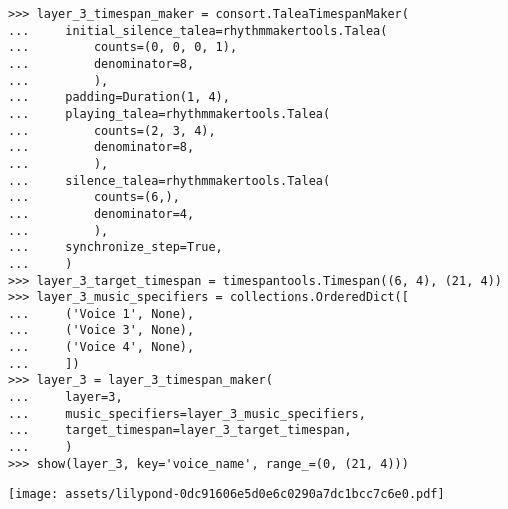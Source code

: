 \begin{comment}
<abjad>
layer_3_timespan_maker = consort.TaleaTimespanMaker(
    initial_silence_talea=rhythmmakertools.Talea(
        counts=(0, 0, 0, 1),
        denominator=8,
        ),
    padding=Duration(1, 4),
    playing_talea=rhythmmakertools.Talea(
        counts=(2, 3, 4),
        denominator=8,
        ),
    silence_talea=rhythmmakertools.Talea(
        counts=(6,),
        denominator=4,
        ),
    synchronize_step=True,
    )
layer_3_target_timespan = timespantools.Timespan((6, 4), (21, 4))
layer_3_music_specifiers = collections.OrderedDict([
    ('Voice 1', None),
    ('Voice 3', None),
    ('Voice 4', None),
    ])
layer_3 = layer_3_timespan_maker(
    layer=3,
    music_specifiers=layer_3_music_specifiers,
    target_timespan=layer_3_target_timespan,
    )
show(layer_3, key='voice_name', range_=(0, (21, 4)))
</abjad>
\end{comment}

\begin{abjadbookoutput}
\begin{singlespacing}
\vspace{-0.5\baselineskip}
\begin{verbatim}
>>> layer_3_timespan_maker = consort.TaleaTimespanMaker(
...     initial_silence_talea=rhythmmakertools.Talea(
...         counts=(0, 0, 0, 1),
...         denominator=8,
...         ),
...     padding=Duration(1, 4),
...     playing_talea=rhythmmakertools.Talea(
...         counts=(2, 3, 4),
...         denominator=8,
...         ),
...     silence_talea=rhythmmakertools.Talea(
...         counts=(6,),
...         denominator=4,
...         ),
...     synchronize_step=True,
...     )
>>> layer_3_target_timespan = timespantools.Timespan((6, 4), (21, 4))
>>> layer_3_music_specifiers = collections.OrderedDict([
...     ('Voice 1', None),
...     ('Voice 3', None),
...     ('Voice 4', None),
...     ])
>>> layer_3 = layer_3_timespan_maker(
...     layer=3,
...     music_specifiers=layer_3_music_specifiers,
...     target_timespan=layer_3_target_timespan,
...     )
>>> show(layer_3, key='voice_name', range_=(0, (21, 4)))
\end{verbatim}
\noindent\texttt{[image: assets/lilypond-0dc91606e5d0e6c0290a7dc1bcc7c6e0.pdf]}
\end{singlespacing}
\end{abjadbookoutput}

